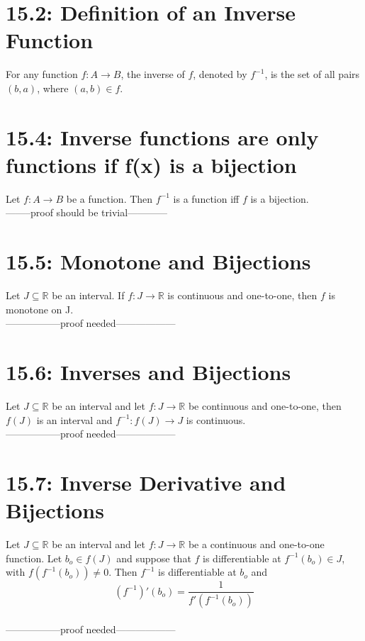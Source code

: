 \documentclass[10pt,letter]{report}
\begin{document}
\section*{15.2: Definition of an Inverse Function}
For any function $f:A\rightarrow B$, the inverse of $f$, denoted by $f^{-1}$, is the set of all pairs $(b,a)$, where $(a,b)\in f$.

\section*{15.4: Inverse functions are only functions if f(x) is a bijection}
Let $f:A\rightarrow B$ be a function. Then $f^{-1}$ is a function iff $f$ is a bijection. \\ 
--------proof should be trivial------------
 
\section*{15.5: Monotone and Bijections}
Let $J\subseteq\mathbb{R}$ be an interval. If $f:J\rightarrow\mathbb{R}$ is continuous and one-to-one, then $f$ is monotone on J. \\ 
-----------------proof needed------------------

\section*{15.6: Inverses and Bijections}
Let $J\subseteq\mathbb{R}$ be an interval and let $f:J\rightarrow\mathbb{R}$ be continuous and one-to-one, then $f(J)$ is an interval and $f^{-1}:f(J)\rightarrow J$ is continuous. \\ 
-----------------proof needed------------------

\section*{15.7: Inverse Derivative and Bijections}
Let $J\subseteq\mathbb{R}$ be an interval and let $f:J\rightarrow\mathbb{R}$ be a continuous and one-to-one function. Let $b_o\in f(J)$ and suppose that $f$ is differentiable at $f^{-1}(b_o)\in J$, with $f(f^{-1}(b_o))\neq0$. Then $f^{-1}$ is differentiable at $b_o$ and $$(f^{-1})'(b_o)=\frac{1}{f'(f^{-1}(b_o))}$$\\ 
-----------------proof needed------------------
\end{document}
